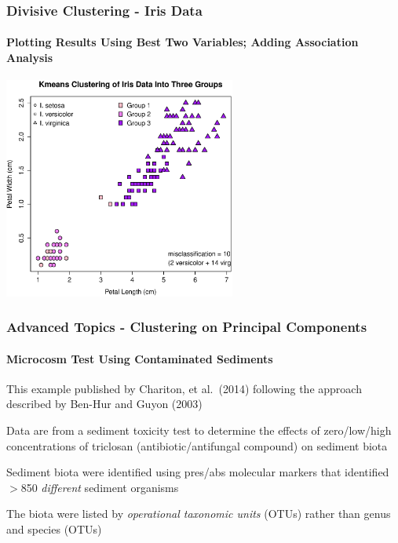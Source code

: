 \documentclass[10pt]{beamer}
\begin{document}
\begin{frame}
\frametitle{Divisive Clustering - Iris Data}
\framesubtitle{Plotting Results Using Best Two Variables; Adding Association Analysis}
\begin{center}
\includegraphics[clip,width=3in]{./part4figures/iriscluster4.ps}
\end{center}
\end{frame}




\begin{frame}[fragile]
\frametitle{Advanced Topics - Clustering on Principal Components}
\framesubtitle{Microcosm Test Using Contaminated Sediments}

\bi
\item This example published by Chariton, et al.~(2014) following the
  approach described by Ben-Hur and Guyon (2003)

\item Data are from a sediment toxicity test to determine the effects
  of zero/low/high concentrations of triclosan (antibiotic/antifungal
  compound) on sediment biota

\item Sediment biota were identified using pres/abs molecular markers
  that identified $>$850 {\em different} sediment organisms
\item The biota were listed by {\em operational taxonomic units}
  (OTUs) rather than genus and species (OTUs)
\ei
\end{frame}
\end{document}

